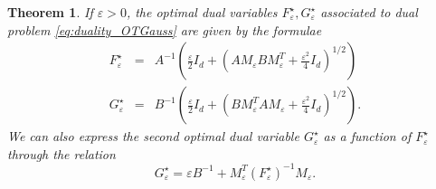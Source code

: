 \documentclass[10pt,a4paper]{amsart}
\newtheorem{thm}{Theorem}
\begin{document}
\begin{thm}\label{thm:optim_potentials}
 If $\varepsilon >0$, the optimal dual variables $F_\varepsilon^{\star}, G_\varepsilon^{\star}$ associated to dual problem \eqref{eq:duality_OTGauss} are given by the formulae
 \begin{equation}\label{eq:optim_dual}
     \begin{array}{ccc}
        F_\varepsilon^{\star} &= &  A^{-1}\left( \frac{\varepsilon}{2}I_d + \left(AM_{\varepsilon}BM_{\varepsilon}^T+ \frac{\varepsilon^2}{4}I_d  \right)^{1/2} \right)\\
        G_\varepsilon^{\star} &=  & B^{-1}\left( \frac{\varepsilon}{2}I_d + \left(BM_\varepsilon^T AM_{\varepsilon}+ \frac{\varepsilon^2}{4}I_d  \right)^{1/2} \right).
     \end{array}
 \end{equation}
We can also express the second optimal dual variable $G_\varepsilon^\star$ as a function of $F_\varepsilon^\star$ through the relation
 \begin{equation}
      G_\varepsilon^{\star} =  \varepsilon B^{-1}+ M_\varepsilon^{T}(F_\varepsilon^{\star})^{-1}M_\varepsilon.
 \end{equation}
\end{thm}
\end{document}
